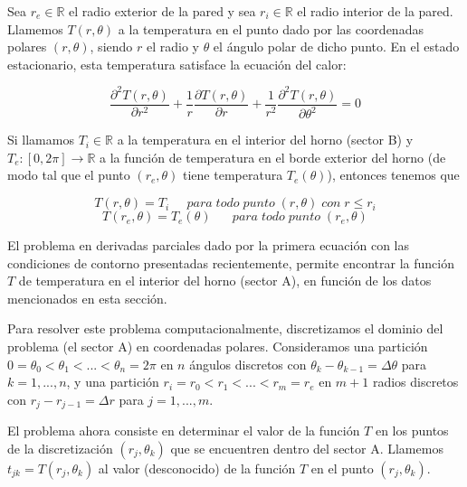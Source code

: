 Sea $r_e \in \mathbb{R}$ el radio exterior de la pared y sea $r_i \in \mathbb{R}$ el radio interior de la pared. Llamemos $T(r,\theta)$ a la temperatura en el punto dado por las coordenadas polares $(r,\theta)$, siendo $r$ el radio y $\theta$ el \'angulo polar de dicho punto. En el estado estacionario, esta temperatura satisface la ecuaci\'on del calor:

\begin{equation}\label{calor}
\frac{\partial^2T(r,\theta)}{\partial r^2}+\frac{1}{r}\frac{\partial T(r,\theta)}{\partial r}+\frac{1}{r^2}\frac{\partial^2T(r,\theta)}{\partial \theta^2} = 0 
\end{equation}


Si llamamos $T_i \in \mathbb{R}$ a la temperatura en el interior del horno (sector B) y $T_e : [0,2\pi] \rightarrow \mathbb{R}$ a la funci\'on de temperatura en el borde exterior del horno (de modo tal que el punto $(r_e,\theta)$ tiene temperatura $T_e(\theta)$), entonces tenemos que

\begin{equation}
T(r,\theta) = T_i \;\;\;\;\;para\;todo\;punto\;(r,\theta)\;con\;r\leq r_i
\end{equation}
\begin{equation}
T(r_e,\theta) = T_e(\theta) \;\;\;\;\;\;para\;todo\;punto\;(r_e,\theta)
\end{equation}


El problema en derivadas parciales dado por la primera ecuaci\'on con las condiciones de contorno presentadas recientemente, permite encontrar la funci\'on $T$ de temperatura en el interior del horno (sector A), en funci\'on de los datos mencionados en esta secci\'on.

Para resolver este problema computacionalmente, discretizamos el dominio del problema (el sector A) en coordenadas polares. Consideramos una partici\'on $0 = \theta_0 < \theta_1 < ... < \theta_n = 2\pi$ en $n$ \'angulos discretos con $\theta_k-\theta_{k-1} = \Delta\theta$ para $k = 1,...,n$, y una partici\'on $r_i = r_0 < r_1 < ... < r_m = r_e$ en $m+1$ radios discretos con $r_j - r_{j-1} = \Delta r$ para $j = 1,...,m$.

\medskip

El problema ahora consiste en determinar el valor de la funci\'on $T$ en los puntos de la discretizaci\'on $(r_j,\theta_k)$ que se encuentren dentro del sector A. Llamemos $t_{jk} = T(r_j,\theta_k)$ al valor (desconocido) de la funci\'on $T$ en el punto $(r_j,\theta_k)$.

